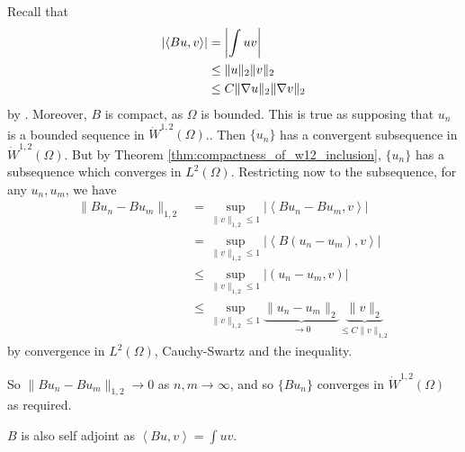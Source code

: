 \documentclass[10pt, oneside, reqno]{amsart}
\theoremstyle{plain}%
\numberwithin{equation}{section}
\theoremstyle{definition}
\theoremstyle{remark}
\newcommand{\iprod}[1]{\left\langle #1 \right\rangle}
\begin{document}
Recall that \begin{align*}
	\left|\iprod{Bu, v}\right| &= \left|\int uv\right| \\
	&\leq \| u \|_2 \| v \|_2 \\
	&\leq C \| \grad u \|_2 \| \grad v \|_2 
\end{align*} by \poincare.  Moreover, $B$ is compact, as $\Omega$ is bounded.  This is true as supposing that $u_n$ is a bounded sequence in $\dot W^{1, 2}(\Omega)$..  Then $\{ u_n \}$ has a convergent subsequence in $\dot W^{1, 2}(\Omega)$.  But by Theorem \ref{thm:compactness_of_w12_inclusion}, $\{ u_n \}$ has a subsequence which converges in $L^2(\Omega)$.  Restricting now to the subsequence, for any $u_n, u_m$, we have \begin{align*}
	\| B u_n - B u_m \|_{1, 2} &= \sup_{\| v \|_{1, 2} \leq 1} \left| \iprod{Bu_n - Bu_m, v} \right| \\
	&= \sup_{\| v \|_{1, 2} \leq 1} \left| \iprod{B(u_n - u_m), v} \right| \\
	&\leq \sup_{\| v \|_{1, 2} \leq 1} \left| (u_n - u_m, v) \right| \\
	&\leq \sup_{\| v \|_{1, 2} \leq 1} \underbrace{\| u_n - u_m \|_2}_{\rightarrow 0} \underbrace{\| v \|_2}_{\leq C \| v \|_{1, 2}} 
\end{align*} by convergence in $L^2(\Omega)$, Cauchy-Swartz and the \poincare inequality.  

So $\| Bu_n - Bu_m \|_{1,2} \rightarrow 0$ as $n,m \rightarrow \infty$, and so $\{ B u_n \}$ converges in $\dot W^{1, 2}(\Omega)$ as required. 

$B$ is also self adjoint as $\iprod{Bu, v} = \int uv$.
\end{document}
